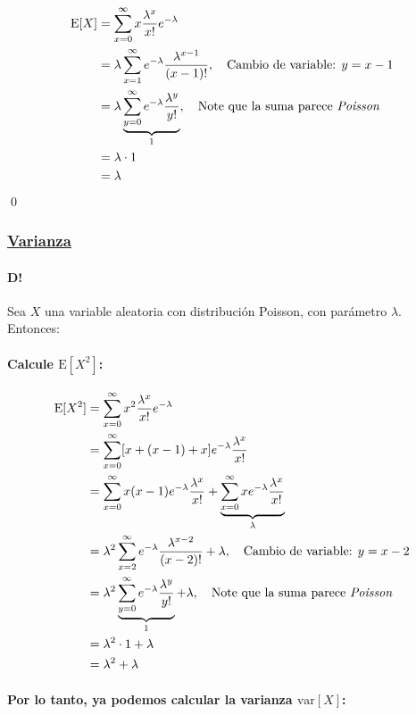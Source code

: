 \documentclass[8pt]{article}
\begin{document}
\begin{align*}
    \text{E}[X] &= \sum_{x=0}^\infty x \frac{\lambda^x}{x!} e^{-\lambda} \\
    &= \lambda \sum_{x=1}^\infty e^{-\lambda} \frac{\lambda^{x-1}}{(x-1)!}, \quad \text{Cambio de variable: } y = x-1 \\
    &= \lambda \underbrace{\sum_{y=0}^\infty e^{-\lambda} \frac{\lambda^y}{y!}}_{1}, \quad \text{Note que la suma parece \textit{Poisson}} \\
    &= \lambda \cdot 1 \\
    &= \lambda
\end{align*}\qed

\subsubsection*{\hyperref[subsec:varianza_poisson_tag]{Varianza}}
\label{subsec:varianza_poisson}

\paragraph{D!} Sea $X$ una variable aleatoria con distribución Poisson, con parámetro $\lambda$. Entonces:

\paragraph*{Calcule $\text{E}[X^2]$:}

\begin{align*}
    \text{E}[X^2] &= \sum_{x=0}^\infty x^2 \frac{\lambda^x}{x!} e^{-\lambda} \\
    &= \sum_{x=0}^\infty [x+(x-1)+x] e^{-\lambda} \frac{\lambda^x}{x!} \\
    &= \sum_{x=0}^\infty x(x-1) e^{-\lambda} \frac{\lambda^x}{x!} + \underbrace{\sum_{x=0}^\infty x e^{-\lambda} \frac{\lambda^x}{x!}}_{\lambda} \\
    &= \lambda^2 \sum_{x=2}^\infty e^{-\lambda} \frac{\lambda^{x-2}}{(x-2)!} + \lambda, \quad \text{Cambio de variable: } y = x-2 \\
    &= \lambda^2 \underbrace{\sum_{y=0}^\infty e^{-\lambda} \frac{\lambda^y}{y!}}_{1} + \lambda, \quad \text{Note que la suma parece \textit{Poisson}} \\
    &= \lambda^2 \cdot 1 + \lambda \\
    &= \lambda^2 + \lambda 
\end{align*}

\paragraph*{Por lo tanto, ya podemos calcular la varianza $\text{var}[X]$:}
\end{document}
